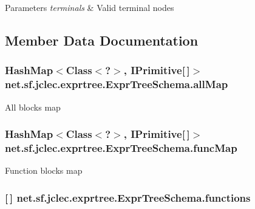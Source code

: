 \begin{DoxyParams}{Parameters}
{\em terminals} & Valid terminal nodes \\
\hline
\end{DoxyParams}


\subsection{Member Data Documentation}
\hypertarget{classnet_1_1sf_1_1jclec_1_1exprtree_1_1_expr_tree_schema_a5b9a3597e40853603084bd67a4b5a09d}{
\subsubsection[{all\-Map}]{\setlength{\rightskip}{0pt plus 5cm}Hash\-Map$<$Class$<$?$>$, {\bf I\-Primitive}\mbox{[}$\,$\mbox{]}$>$ net.\-sf.\-jclec.\-exprtree.\-Expr\-Tree\-Schema.\-all\-Map\hspace{0.3cm}{\ttfamily [protected]}}}\label{classnet_1_1sf_1_1jclec_1_1exprtree_1_1_expr_tree_schema_a5b9a3597e40853603084bd67a4b5a09d}
All blocks map \hypertarget{classnet_1_1sf_1_1jclec_1_1exprtree_1_1_expr_tree_schema_aadf3e30ac3d79e7b5dfae0e0caf7d658}{
\subsubsection[{func\-Map}]{\setlength{\rightskip}{0pt plus 5cm}Hash\-Map$<$Class$<$?$>$, {\bf I\-Primitive}\mbox{[}$\,$\mbox{]}$>$ net.\-sf.\-jclec.\-exprtree.\-Expr\-Tree\-Schema.\-func\-Map\hspace{0.3cm}{\ttfamily [protected]}}}\label{classnet_1_1sf_1_1jclec_1_1exprtree_1_1_expr_tree_schema_aadf3e30ac3d79e7b5dfae0e0caf7d658}
Function blocks map \hypertarget{classnet_1_1sf_1_1jclec_1_1exprtree_1_1_expr_tree_schema_aca234d53fec87216b84803146e1b23c6}{
\subsubsection[{functions}]{ \mbox{[}$\,$\mbox{]} net.\-sf.\-jclec.\-exprtree.\-Expr\-Tree\-Schema.\-functions\hspace{0.3cm}{\ttfamily [protected]}}}\label{classnet_1_1sf_1_1jclec_1_1exprtree_1_1_expr_tree_schema_aca234d53fec87216b84803146e1b23c6}
